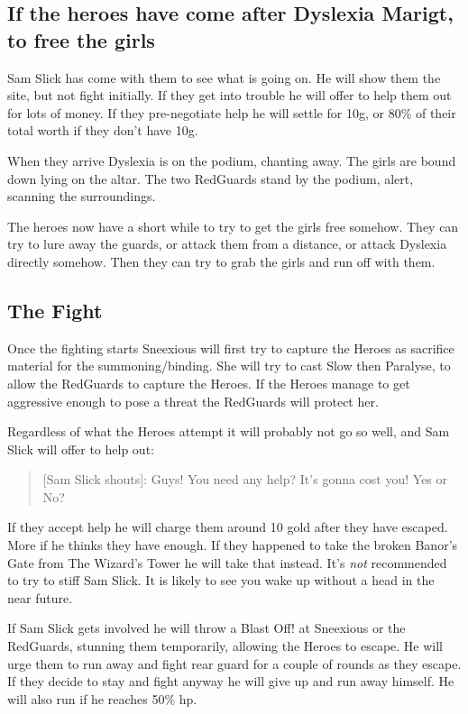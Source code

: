 \documentclass[11pt, twoside, titlepage, a4paper]{report}
\newenvironment{readoutloud}%
{\begin{quote}\begin{itshape}}%
{\end{itshape}\end{quote}}%
\begin{document}
\subsection*{If the heroes have come after Dyslexia Marigt, to free the girls}
Sam Slick has come with them to see what is going on. He will show them the site, but not fight initially. If they get into trouble he will offer to help them out for lots of money. If they pre-negotiate help he will settle for 10g, or 80\% of their total worth if they don't have 10g.

When they arrive Dyslexia is on the podium, chanting away. The girls are bound down lying on the altar. The two RedGuards stand by the podium, alert, scanning the surroundings.

The heroes now have a short while to try to get the girls free somehow. They can try to lure away the guards, or attack them from a distance, or attack Dyslexia directly somehow. Then they can try to grab the girls and run off with them.


\subsection*{The Fight}
Once the fighting starts Sneexious will first try to capture the Heroes as sacrifice material for the summoning/binding. She will try to cast Slow then Paralyse, to allow the RedGuards to capture the Heroes. If the Heroes manage to get aggressive enough to pose a threat the RedGuards will protect her.

Regardless of what the Heroes attempt it will probably not go so well, and Sam Slick will offer to help out:
\begin{readoutloud}
\textnormal{[Sam Slick shouts]:} Guys! You need any help? It's gonna cost you! Yes or No?
\end{readoutloud}
If they accept help he will charge them around 10 gold after they have escaped. More if he thinks they have enough. If they happened to take the broken Banor's Gate from The Wizard's Tower he will take that instead. It's \emph{not} recommended to try to stiff Sam Slick. It is likely to see you wake up without a head in the near future.

If Sam Slick gets involved he will throw a Blast Off! at Sneexious or the RedGuards, stunning them temporarily, allowing the Heroes to escape. He will urge them to run away and fight rear guard for a couple of rounds as they escape. If they decide to stay and fight anyway he will give up and run away himself. He will also run if he reaches 50\% hp.
\end{document}
